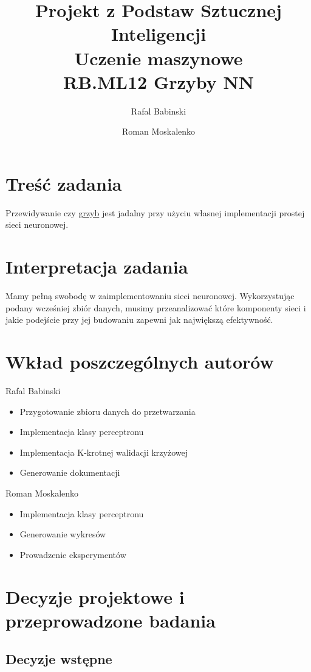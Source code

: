 \documentclass[12pt,a4paper]{article}
\title{Projekt z Podstaw Sztucznej Inteligencji\\
Uczenie maszynowe\\
RB.ML12 Grzyby NN}
\author{
	Rafal Babinski 
\and 
	Roman Moskalenko
}
\date{}
\begin{document}
\maketitle

\section{Treść zadania}

Przewidywanie czy \href{https://archive.ics.uci.edu/ml/datasets/mushroom}{grzyb} jest jadalny przy użyciu własnej implementacji prostej sieci neuronowej.

\section{Interpretacja zadania}

Mamy pełną swobodę w zaimplementowaniu sieci neuronowej. Wykorzystując podany wcześniej zbiór danych, musimy przeanalizować które komponenty sieci i jakie podejście przy jej budowaniu zapewni jak największą efektywność.

\section{Wkład poszczególnych autorów}

Rafal Babinski

\begin{itemize}
	\item	Przygotowanie zbioru danych do przetwarzania
	\item 	Implementacja klasy perceptronu
	\item 	Implementacja K-krotnej walidacji krzyżowej
	\item	Generowanie dokumentacji
\end{itemize}
Roman Moskalenko

\begin{itemize}
	\item 	Implementacja klasy perceptronu
  \item	Generowanie wykresów
  \item	Prowadzenie eksperymentów
\end{itemize}

\section{Decyzje projektowe i przeprowadzone badania}

\subsection{Decyzje wstępne}
\end{document}
